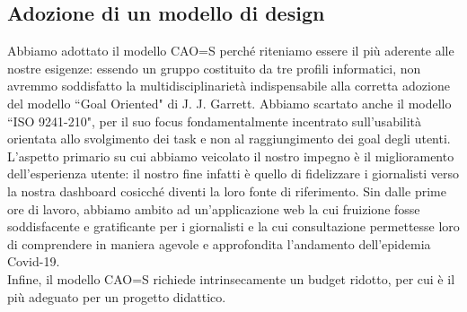 \subsection{Adozione di un modello di design}

Abbiamo adottato il modello CAO=S perché riteniamo essere il più aderente alle nostre esigenze: essendo un gruppo costituito da tre profili informatici, non avremmo soddisfatto la multidisciplinarietà indispensabile alla corretta adozione del modello ``Goal Oriented" di J. J. Garrett.
Abbiamo scartato anche il modello ``ISO 9241-210", per il suo focus fondamentalmente incentrato sull'usabilità orientata allo svolgimento dei task e non al raggiungimento dei goal degli utenti.
L'aspetto primario su cui abbiamo veicolato il nostro impegno è il miglioramento dell'esperienza utente: il nostro fine infatti è quello di fidelizzare i giornalisti verso la nostra dashboard cosicché diventi la loro fonte di riferimento.
Sin dalle prime ore di lavoro, abbiamo ambito ad un'applicazione web la cui fruizione fosse soddisfacente e gratificante per i giornalisti e la cui consultazione permettesse loro di comprendere in maniera agevole e approfondita l'andamento dell'epidemia Covid-19.\\
Infine, il modello CAO=S richiede intrinsecamente un budget ridotto, per cui è il più adeguato per un progetto didattico. 
